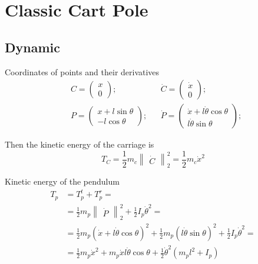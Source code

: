 \documentclass[unicode]{article}
\newcommand{\pmat}[1]{\begin{pmatrix}#1\end{pmatrix}}
\begin{document}
\section{Classic Cart Pole}

\subsection{Dynamic}

\begin{center}
    
\end{center}

Coordinates of points and their derivatives
\begin{align*}
    & C = \pmat{x                 \\ 0};  & &\dot{C} = \pmat{\dot{x} \\ 0}; \\
    & P = \pmat{x + l \sin \theta \\ - l \cos \theta}; & &\dot{P} = \pmat{\dot{x} + l \dot{\theta} \cos \theta \\ l \dot{\theta} \sin \theta};
\end{align*}

Then the kinetic energy of the carriage is
\[
    T_C = \frac{1}{2} m_c \begin{Vmatrix}
        \dot{C}
    \end{Vmatrix}_2^2 = \frac{1}{2} m_c \dot{x}^2
\]


Kinetic energy of the pendulum
\begin{align*}
    T_p & = T^t_p + T^r_p =                                                                                                                             \\
        & = \frac{1}{2} m_p \begin{Vmatrix}\dot{P}\end{Vmatrix}_2^2 + \frac{1}{2}I_p\dot{\theta}^2 =                                                              \\
        & = \frac{1}{2} m_p (\dot{x} + l \dot{\theta} \cos \theta )^2 + \frac{1}{2} m_p (l \dot{\theta} \sin \theta)^2 + \frac{1}{2}I_p\dot{\theta}^2 = \\
        & = \frac{1}{2} m_p \dot{x}^2 + m_p \dot{x} l \dot{\theta} \cos \theta + \frac{1}{2} \dot{\theta}^2 \left( m_p l^2  + I_p \right)               \\
\end{align*}
\end{document}

